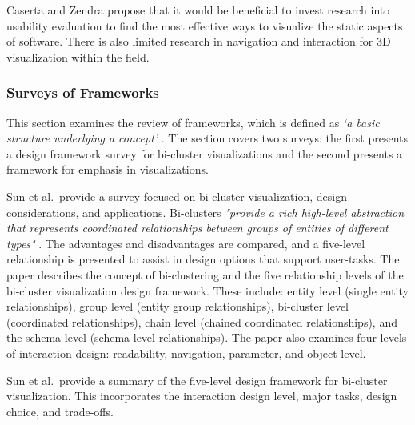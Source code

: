 Caserta and Zendra propose that it would be beneficial to invest research into usability evaluation to find the most effective ways to visualize the static aspects of software. There is also limited research in navigation and interaction for 3D visualization within the field.


\subsubsection{Surveys of Frameworks}
This section examines the review of frameworks, which is defined as \textit{`a basic structure underlying a concept'} \cite{frameworkdictionary}. The section covers two surveys: the first presents a design framework survey for bi-cluster visualizations and the second presents a framework for emphasis in visualizations.

Sun et al.\ provide a survey focused on bi-cluster visualization, design considerations, and applications. Bi-clusters \textit{"provide a rich high-level abstraction that represents coordinated relationships between groups of entities of different types"} \cite{sun2014five}. The advantages and disadvantages are compared, and a five-level relationship is presented to assist in design options that support user-tasks.
The paper describes the concept of bi-clustering and the five relationship levels of the bi-cluster visualization design framework. These include: entity level (single entity relationships), group level (entity group relationships), bi-cluster level (coordinated relationships), chain level (chained coordinated relationships), and the schema level (schema level relationships). The paper also examines four levels of interaction design: readability, navigation, parameter, and object level.

Sun et al.\ provide a summary of the five-level design framework for bi-cluster visualization. This incorporates the interaction design level, major tasks, design choice, and trade-offs.

